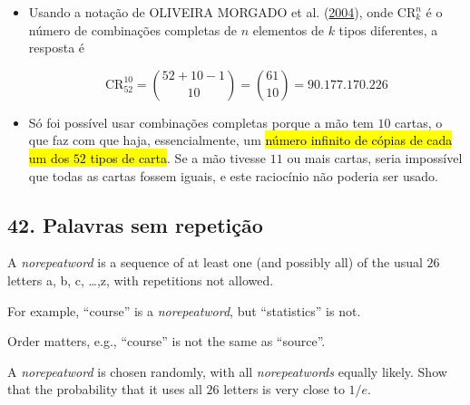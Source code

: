 \documentclass[
  11pt]{report}
\begin{document}
\begin{itemize}
\item
  Usando a notação de OLIVEIRA MORGADO et al. (\protect\hyperlink{ref-oliveira-2004-analis}{2004}), onde $\text{CR}_k^n$ é o número de combinações completas de $n$ elementos de $k$ tipos diferentes, a resposta é

  \[
  \text{CR}_{52}^{10} = \binom{52 + 10 - 1}{10} = \binom{61}{10} =
  90.177.170.226
  \]
\item
  Só foi possível usar combinações completas porque a mão tem $10$ cartas, o que faz com que haja, essencialmente, um {\hl{número infinito de cópias de cada um dos $52$ tipos de carta}}. Se a mão tivesse $11$ ou mais cartas, seria impossível que todas as cartas fossem iguais, e este raciocínio não poderia ser usado.
\end{itemize}

\hypertarget{palavras-sem-repetiuxe7uxe3o}{%
\subsection*{42. Palavras sem repetição}\label{palavras-sem-repetiuxe7uxe3o}}

\begin{rmdbox}
A \emph{norepeatword} is a sequence of at least one (and possibly all) of the usual $26$ letters a, b, c, \ldots,z, with repetitions not allowed.

For example, ``course'' is a \emph{norepeatword}, but ``statistics'' is not.

Order matters, e.g., ``course'' is not the same as ``source''.

A \emph{norepeatword} is chosen randomly, with all \emph{norepeatwords} equally likely. Show that the probability that it uses all $26$ letters is very close to $1/e$.

\end{rmdbox}
\end{document}
